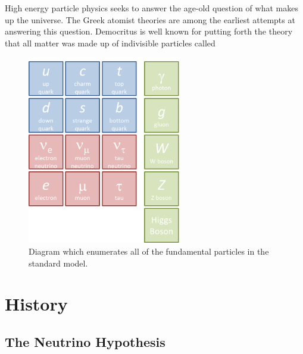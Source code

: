 High energy particle physics seeks to answer the age-old question of what makes up the universe.  The Greek atomist theories are among the earliest attempts at answering this question.  Democritus is well known for putting forth the theory that all matter was made up of indivisible particles called  

\begin{figure}[b!]
  \begin{center}
    \includegraphics[width=0.6\textwidth]{figures/figures/sm.png}
  \end{center}
  \caption{Diagram which enumerates all of the fundamental particles in the standard model.}
  \label{oscilloscope}
\end{figure}


\section{History}

\subsection{The Neutrino Hypothesis}


